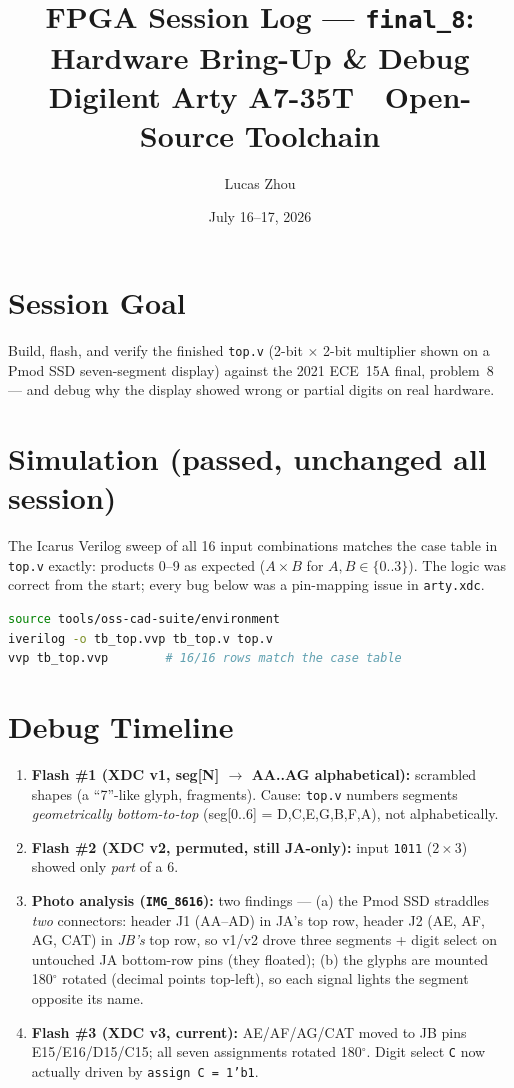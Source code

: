 \documentclass[11pt]{article}
\title{FPGA Session Log --- \texttt{final\_8}: Hardware Bring-Up \& Debug\\
\large Digilent Arty A7-35T \,\textperiodcentered\, Open-Source Toolchain}
\author{Lucas Zhou}
\date{July 16--17, 2026}
\begin{document}
\maketitle

\section{Session Goal}
Build, flash, and verify the finished \texttt{top.v} (2-bit $\times$ 2-bit
multiplier shown on a Pmod SSD seven-segment display) against the 2021
ECE~15A final, problem~8 --- and debug why the display showed wrong or
partial digits on real hardware.

\section{Simulation (passed, unchanged all session)}
The Icarus Verilog sweep of all 16 input combinations matches the case
table in \texttt{top.v} exactly: products 0--9 as expected
($A\times B$ for $A,B \in \{0..3\}$). The logic was correct from the
start; every bug below was a pin-mapping issue in \texttt{arty.xdc}.

\begin{lstlisting}[language=bash]
source tools/oss-cad-suite/environment
iverilog -o tb_top.vvp tb_top.v top.v
vvp tb_top.vvp        # 16/16 rows match the case table
\end{lstlisting}

\section{Debug Timeline}
\begin{enumerate}
  \item \textbf{Flash \#1 (XDC v1, seg[N] $\to$ AA..AG alphabetical):}
    scrambled shapes (a ``7''-like glyph, fragments). Cause:
    \texttt{top.v} numbers segments \emph{geometrically bottom-to-top}
    (seg[0..6] = D,C,E,G,B,F,A), not alphabetically.
  \item \textbf{Flash \#2 (XDC v2, permuted, still JA-only):} input
    \texttt{1011} ($2\times3$) showed only \emph{part} of a 6.
  \item \textbf{Photo analysis (\texttt{IMG\_8616}):} two findings ---
    (a) the Pmod SSD straddles \emph{two} connectors: header J1
    (AA--AD) in JA's top row, header J2 (AE, AF, AG, CAT) in
    \emph{JB's} top row, so v1/v2 drove three segments + digit select
    on untouched JA bottom-row pins (they floated); (b) the glyphs are
    mounted 180$^\circ$ rotated (decimal points top-left), so each
    signal lights the segment opposite its name.
  \item \textbf{Flash \#3 (XDC v3, current):} AE/AF/AG/CAT moved to JB
    pins E15/E16/D15/C15; all seven assignments rotated 180$^\circ$.
    Digit select \texttt{C} now actually driven by
    \texttt{assign C = 1'b1}.
\end{enumerate}
\end{document}
